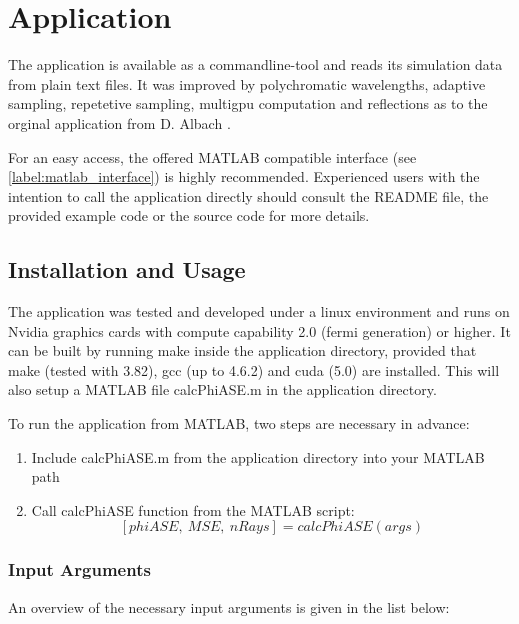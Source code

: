 \section{Application}
\label{sec:application}

The application is available as a commandline-tool and reads
its simulation data from plain text files. It was improved by polychromatic
wavelengths, adaptive sampling, repetetive sampling, multigpu computation and 
reflections as to the orginal application from D. Albach \cite{ASE2010}.

For an easy access, the offered MATLAB compatible interface (see \ref{label:matlab_interface}) 
is highly recommended. Experienced users with the intention to call the application
directly should consult the README file, the provided 
example code or the source code for more details.

\subsection{Installation and Usage}
The application was tested and developed under a linux environment
and runs on Nvidia graphics cards with compute capability 2.0 (fermi generation) or higher.
It can be built by running make inside the application directory, provided
that make (tested with 3.82), gcc (up to 4.6.2) and cuda (5.0) are installed. 
This will also setup a MATLAB file calcPhiASE.m in the application
directory. 

To run the application from MATLAB, two steps are
necessary in advance:
\begin{enumerate}
  \label{label:matlab_interface}
  \item Include calcPhiASE.m from the application directory into your MATLAB path
  \item Call calcPhiASE function from the MATLAB script: \[[phiASE,~MSE,~nRays] = calcPhiASE(args)\]
\end{enumerate}

\subsubsection{Input Arguments}
An overview of the necessary input arguments is given 
in the list below:

